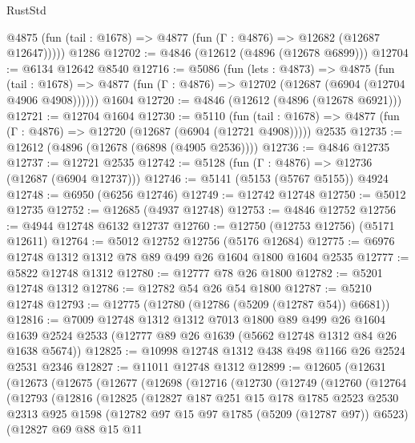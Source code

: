 \begin{lexlean}{RustStd}
\begin{coremodule}
      @4875 (fun (tail : @1678) => @4877 (fun (Γ : @4876) => @12682 (@12687 @12647)))))
    @1286
@12702 := @4846 (@12612 (@4896 (@12678 @6899)))
@12704 := @6134 @12642 @8540
@12716 := @5086
    (fun (lets : @4873) =>
    @4875
      (fun (tail : @1678) =>
      @4877 (fun (Γ : @4876) => @12702 (@12687 (@6904 (@12704 @4906 @4908))))))
    @1604
@12720 := @4846 (@12612 (@4896 (@12678 @6921)))
@12721 := @12704 @1604
@12730 := @5110
    (fun (tail : @1678) => @4877 (fun (Γ : @4876) => @12720 (@12687 (@6904 (@12721 @4908)))))
    @2535
@12735 := @12612 (@4896 (@12678 (@6898 (@4905 @2536))))
@12736 := @4846 @12735
@12737 := @12721 @2535
@12742 := @5128 (fun (Γ : @4876) => @12736 (@12687 (@6904 @12737)))
@12746 := @5141 (@5153 (@5767 @5155)) @4924
@12748 := @6950 (@6256 @12746)
@12749 := @12742 @12748
@12750 := @5012 @12735
@12752 := @12685 (@4937 @12748)
@12753 := @4846 @12752
@12756 := @4944 @12748 @6132 @12737
@12760 := @12750 (@12753 @12756) (@5171 @12611)
@12764 := @5012 @12752 @12756 (@5176 @12684)
@12775 := @6976 @12748 @1312 @1312 @78 @89 @499 @26 @1604 @1800 @1604 @2535
@12777 := @5822 @12748 @1312
@12780 := @12777 @78 @26 @1800
@12782 := @5201 @12748 @1312
@12786 := @12782 @54 @26 @54 @1800
@12787 := @5210 @12748
@12793 := @12775 (@12780 (@12786 (@5209 (@12787 @54)) @6681))
@12816 := @7009
    @12748
    @1312
    @1312
    @7013
    @1800
    @89
    @499
    @26
    @1604
    @1639
    @2524
    @2533
    (@12777 @89 @26 @1639 (@5662 @12748 @1312 @84 @26 @1638 @5674))
@12825 := @10998 @12748 @1312 @438 @498 @1166 @26 @2524 @2531 @2346
@12827 := @11011 @12748 @1312
@12899 := @12605
    (@12631
      (@12673
        (@12675
          (@12677
            (@12698
              (@12716
                (@12730
                  (@12749
                    (@12760
                      (@12764
                        (@12793
                          (@12816
                            (@12825
                              (@12827
                                @187
                                @251
                                @15
                                @178
                                @1785
                                @2523
                                @2530
                                @2313
                                @925
                                @1598
                                (@12782 @97 @15 @97 @1785 (@5209 (@12787 @97)) @6523)
                                (@12827
                                  @69
                                  @88
                                  @15
                                  @11

\end{coremodule}
\end{lexlean}
